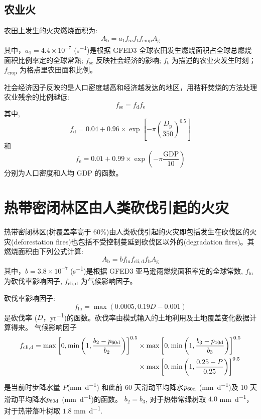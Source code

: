 \subsection{农业火}

农田上发生的火灾燃烧面积为:
\begin{equation}
  A_{\mathrm{b}}=a_{1} f_{\mathrm{s e}} f_{\mathrm{t}} f_{\mathrm{c r o p}} A_{\mathrm{g}}
\end{equation}
%
其中，$a_{1} =4.4\times10^{-7}$ (\unit{s^{-1}})是根据 GFED3 全球农田发生燃烧面积占全球总燃烧面积比例率定的全球常熟; $f_{\mathrm{se}}$ 反映社会经济的影响; $f_{\mathrm {t}} $ 为描述的农业火发生时刻；$f_{\mathrm{crop}}$ 为格点里农田面积比例。


社会经济因子反映的是人口密度越高和经济越发达的地区，用秸秆焚烧的方法处理农业残余的比例越低:
\begin{equation}
  f_{\mathrm{se}} = f_{\mathrm {d}}  f_{\mathrm {e}}
\end{equation}
其中,
\begin{equation}
  f_{\mathrm{d}}=0.04+0.96 \times \exp \left[-\pi\left(\frac{D_{\mathrm{p}}}{350}\right)^{0.5}\right]
\end{equation}
和
\begin{equation}
  f_{\mathrm{e}}=0.01+0.99 \times \exp \left(-\pi \frac{\text{GDP}}{10}\right)
\end{equation}
分别为人口密度和人均 GDP 的函数。


\section{热带密闭林区由人类砍伐引起的火灾}
热带密闭林区(树覆盖率高于 60\%)由人类砍伐引起的火灾即包括发生在砍伐区的火灾(deforestation fires)也包括不受控制蔓延到砍伐区以外的(degradation fires)。其燃烧面积由下列公式计算:
\begin{equation}
  A_{\mathrm{b}}=b f_{\mathrm{l u}} f_{\mathrm{c l i, d}} f_{\mathrm{b}} A_{\mathrm{g}}
\end{equation}
%
其中，$b =3.8\times10^{-7}$ (\unit{s^{-1}})是根据 GFED3 亚马逊雨燃烧面积率定的全球常数, $f_{\mathrm{lu}}$ 为砍伐率影响因子, $f_{\mathrm{cli,d}}$ 为气候影响因子。

砍伐率影响因子:
\begin{equation}
  f_{\mathrm{lu}} = \max(0.0005, 0.19D - 0.001)
\end{equation}
是砍伐率 ($D$，\unit{yr^{-1}})的函数。砍伐率由模式输入的土地利用及土地覆盖变化数据计算得来。
气候影响因子
\begin{equation}
  \begin{aligned}
    f_{\mathrm{c l i, d}}=\max\left[0, \min \left(1, \frac{b_{2}-p_{\rm 60d}}{b_{2}}\right)\right]^{0.5}& \times\max\left[0, \min \left(1, \frac{b_{3}-p_{\rm 10d}}{b_{3}}\right)\right]^{0.5}\\
    & \times\max\left[0, \min \left(1, \frac{0.25-P}{0.25}\right)\right]^{0.5}
  \end{aligned}
\end{equation}
是当前时步降水量 $P$(\unit{mm.d^{-1}}) 和此前 60 天滑动平均降水$p_{\rm 60d}$ (\unit{mm.d^{-1}})及 10 天滑动平均降水$p_{\rm 60d}$ (\unit{mm.d^{-1}})的函数。 $b_2 = b_3$, 对于热带常绿树取 $4.0$ \unit{mm.d^{-1}}，对于热带落叶树取 $1.8$ \unit{mm.d^{-1}}.


